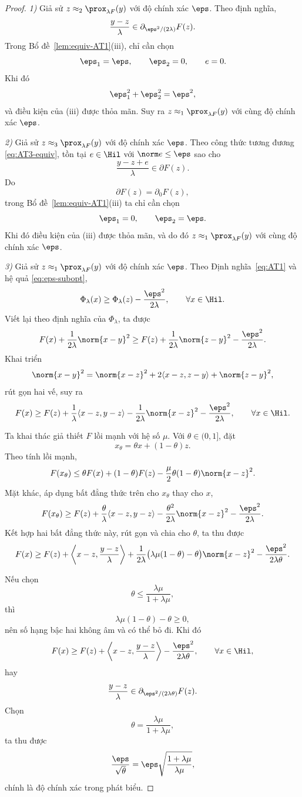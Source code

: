 \begin{proof}

\emph{1)} Giả sử
$
z\approx_2\prox_{\lambda F}(y)
$
với độ chính xác $\eps$. Theo định nghĩa,
\[
\frac{y-z}{\lambda}
\in
\partial_{\eps^2/(2\lambda)}F(z).
\]
Trong Bổ đề~\ref{lem:equiv-AT1}(iii), chỉ cần chọn
\[
\eps_1=\eps,\qquad
\eps_2=0,\qquad
e=0.
\]
Khi đó
\[
\eps_1^2+\eps_2^2=\eps^2,
\]
và điều kiện của (iii) được thỏa mãn. Suy ra
$
z\approx_1\prox_{\lambda F}(y)
$
với cùng độ chính xác $\eps$.

\medskip

\emph{2)} Giả sử
$
z\approx_3\prox_{\lambda F}(y)
$
với độ chính xác $\eps$. Theo công thức tương đương
\eqref{eq:AT3-equiv}, tồn tại
$e\in\Hil$ với
$\norm e\le\eps$ sao cho
\[
\frac{y-z+e}{\lambda}
\in
\partial F(z).
\]
Do
\[
\partial F(z)=\partial_0F(z),
\]
trong Bổ đề~\ref{lem:equiv-AT1}(iii) ta chỉ cần chọn
\[
\eps_1=0,\qquad
\eps_2=\eps.
\]
Khi đó điều kiện của (iii) được thỏa mãn, và do đó
$
z\approx_1\prox_{\lambda F}(y)
$
với cùng độ chính xác $\eps$.

\medskip

\emph{3)} Giả sử
$
z\approx_1\prox_{\lambda F}(y)
$
với độ chính xác $\eps$. Theo Định nghĩa~\ref{eq:AT1} và hệ quả
\eqref{eq:eps-subopt},
\[
\Phi_\lambda(x)
\ge
\Phi_\lambda(z)
-
\frac{\eps^2}{2\lambda},
\qquad
\forall x\in\Hil.
\]
Viết lại theo định nghĩa của $\Phi_\lambda$, ta được
\[
F(x)
+
\frac1{2\lambda}\norm{x-y}^2
\ge
F(z)
+
\frac1{2\lambda}\norm{z-y}^2
-
\frac{\eps^2}{2\lambda}.
\]
Khai triển
\[
\norm{x-y}^2
=
\norm{x-z}^2
+
2\langle x-z,z-y\rangle
+
\norm{z-y}^2,
\]
rút gọn hai vế, suy ra
\[
F(x)
\ge
F(z)
+
\frac1\lambda
\langle x-z,y-z\rangle
-
\frac1{2\lambda}\norm{x-z}^2
-
\frac{\eps^2}{2\lambda},
\qquad
\forall x\in\Hil.
\]

Ta khai thác giả thiết $F$ lồi mạnh với hệ số $\mu$. Với
$\theta\in(0,1]$, đặt
\[
x_\theta
=
\theta x+(1-\theta)z.
\]
Theo tính lồi mạnh,
\[
F(x_\theta)
\le
\theta F(x)
+
(1-\theta)F(z)
-
\frac\mu2
\theta(1-\theta)
\norm{x-z}^2.
\]
Mặt khác, áp dụng bất đẳng thức trên cho $x_\theta$ thay cho $x$,
\[
F(x_\theta)
\ge
F(z)
+
\frac{\theta}{\lambda}
\langle x-z,y-z\rangle
-
\frac{\theta^2}{2\lambda}
\norm{x-z}^2
-
\frac{\eps^2}{2\lambda}.
\]
Kết hợp hai bất đẳng thức này, rút gọn và chia cho $\theta$, ta thu được
\[
F(x)
\ge
F(z)
+
\left\langle
x-z,
\frac{y-z}{\lambda}
\right\rangle
+
\frac{1}{2\lambda}
\bigl(
\lambda\mu(1-\theta)-\theta
\bigr)
\norm{x-z}^2
-
\frac{\eps^2}{2\lambda\theta}.
\]

Nếu chọn
\[
\theta
\le
\frac{\lambda\mu}{1+\lambda\mu},
\]
thì
\[
\lambda\mu(1-\theta)-\theta\ge0,
\]
nên số hạng bậc hai không âm và có thể bỏ đi. Khi đó
\[
F(x)
\ge
F(z)
+
\left\langle
x-z,
\frac{y-z}{\lambda}
\right\rangle
-
\frac{\eps^2}{2\lambda\theta},
\qquad
\forall x\in\Hil,
\]
hay
\[
\frac{y-z}{\lambda}
\in
\partial_{\eps^2/(2\lambda\theta)}F(z).
\]
Chọn
\[
\theta
=
\frac{\lambda\mu}{1+\lambda\mu},
\]
ta thu được
\[
\frac{\eps}{\sqrt{\theta}}
=
\eps
\sqrt{\frac{1+\lambda\mu}{\lambda\mu}},
\]
chính là độ chính xác trong phát biểu.


\end{proof}
